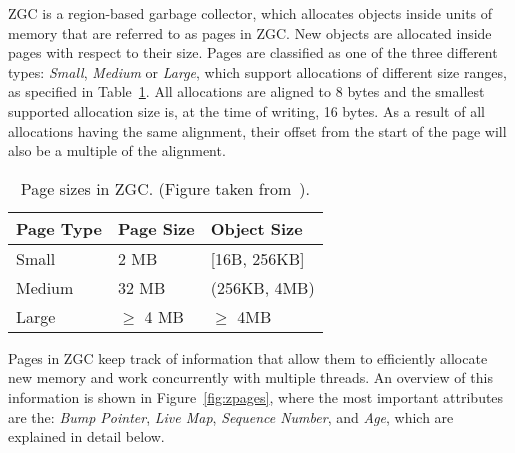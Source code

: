 
ZGC is a region-based garbage collector, which allocates objects inside units of memory that are referred to as pages in ZGC. New objects are allocated inside pages with respect to their size. Pages are classified as one of the three different types: \textit{Small}, \textit{Medium} or \textit{Large}, which support allocations of different size ranges, as specified in Table~\ref{table:zpage_sizes}. All allocations are aligned to 8 bytes and the smallest supported allocation size is, at the time of writing, 16 bytes. As a result of all allocations having the same alignment, their offset from the start of the page will also be a multiple of the alignment.

\begin{table}[H]
    \centering
    \begin{tabular}{lllll}
        Page Type   & Page Size     & \multicolumn{3}{l}{Object Size}      \\ \hline
        Small       & 2 MB          & \multicolumn{3}{l}{{[}16B, 256KB{]}} \\
        Medium      & 32 MB         & \multicolumn{3}{l}{(256KB, 4MB)}     \\
        Large       & $\geq$ 4 MB   & \multicolumn{3}{l}{$\geq$ 4MB}       \\
    \end{tabular}
    \caption{Page sizes in ZGC. (Figure taken from~\cite{zpage_size_table}). }
    \label{table:zpage_sizes}
\end{table}

Pages in ZGC keep track of information that allow them to efficiently allocate new memory and work concurrently with multiple threads. An overview of this information is shown in Figure~\ref{fig:zpages}, where the most important attributes are the: \textit{Bump Pointer}, \textit{Live Map}, \textit{Sequence Number}, and \textit{Age}, which are explained in detail below.

